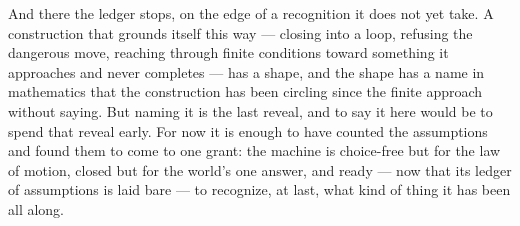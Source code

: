 And there the ledger stops, on the edge of a recognition it does not yet take. A construction that grounds itself
this way --- closing into a loop, refusing the dangerous move, reaching through finite conditions toward
something it approaches and never completes --- has a shape, and the shape has a name in mathematics that the
construction has been circling since the finite approach without saying. But naming it is the last reveal, and to
say it here would be to spend that reveal early. For now it is enough to have counted the assumptions and found
them to come to one grant: the machine is choice-free but for the law of motion, closed but for the world's one
answer, and ready --- now that its ledger of assumptions is laid bare --- to recognize, at last, what kind of
thing it has been all along.
